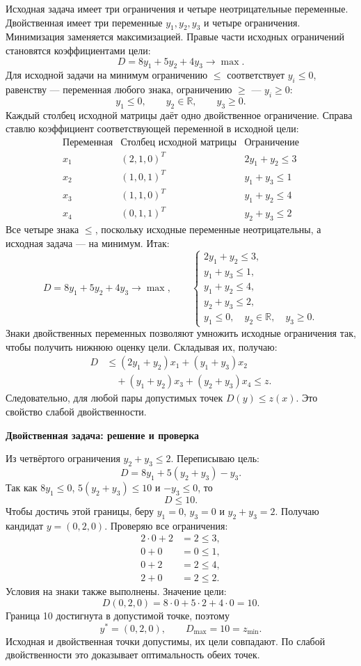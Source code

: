 \documentclass[12pt,a4paper]{article}
\begin{document}
Исходная задача имеет три ограничения и четыре неотрицательные переменные.
Двойственная имеет три переменные $y_1,y_2,y_3$ и четыре ограничения.
Минимизация заменяется максимизацией. Правые части исходных ограничений
становятся коэффициентами цели:
\[
D=8y_1+5y_2+4y_3\to\max.
\]
Для исходной задачи на минимум ограничению $\le$ соответствует $y_i\le0$,
равенству --- переменная любого знака, ограничению $\ge$ --- $y_i\ge0$:
\[
y_1\le0,\qquad y_2\in\mathbb R,\qquad y_3\ge0.
\]
Каждый столбец исходной матрицы даёт одно двойственное ограничение.
Справа ставлю коэффициент соответствующей переменной в исходной цели:
\[
\begin{array}{c|c|c}
\text{Переменная}&\text{Столбец исходной матрицы}&\text{Ограничение}\\\hline
x_1&(2,1,0)^T&2y_1+y_2\le3\\
x_2&(1,0,1)^T&y_1+y_3\le1\\
x_3&(1,1,0)^T&y_1+y_2\le4\\
x_4&(0,1,1)^T&y_2+y_3\le2
\end{array}
\]
Все четыре знака $\le$, поскольку исходные переменные неотрицательны,
а исходная задача --- на минимум. Итак:
\[
\boxed{D=8y_1+5y_2+4y_3\to\max,}
\qquad
\begin{cases}
2y_1+y_2\le3,\\
y_1+y_3\le1,\\
y_1+y_2\le4,\\
y_2+y_3\le2,\\
y_1\le0,\quad y_2\in\mathbb R,\quad y_3\ge0.
\end{cases}
\]
Знаки двойственных переменных позволяют умножить исходные ограничения
так, чтобы получить нижнюю оценку цели. Складывая их, получаю:
\[
\begin{aligned}
D&\le(2y_1+y_2)x_1+(y_1+y_3)x_2\\
&\quad +(y_1+y_2)x_3+(y_2+y_3)x_4\le z.
\end{aligned}
\]
Следовательно, для любой пары допустимых точек $D(y)\le z(x)$.
Это свойство слабой двойственности.
\newpage
\par\textbf{Двойственная задача: решение и проверка}\par

Из четвёртого ограничения $y_2+y_3\le2$. Переписываю цель:
\[
D=8y_1+5(y_2+y_3)-y_3.
\]
Так как $8y_1\le0$, $5(y_2+y_3)\le10$ и $-y_3\le0$, то
\[
D\le10.
\]
Чтобы достичь этой границы, беру $y_1=0$, $y_3=0$ и $y_2+y_3=2$.
Получаю кандидат $y=(0,2,0)$. Проверяю все ограничения:
\[
\begin{aligned}
2\cdot0+2&=2\le3,\\
0+0&=0\le1,\\
0+2&=2\le4,\\
2+0&=2\le2.
\end{aligned}
\]
Условия на знаки также выполнены. Значение цели:
\[
D(0,2,0)=8\cdot0+5\cdot2+4\cdot0=10.
\]
Граница 10 достигнута в допустимой точке, поэтому
\[
\boxed{y^*=(0,2,0),\qquad D_{\max}=10=z_{\min}.}
\]
Исходная и двойственная точки допустимы, их цели совпадают.
По слабой двойственности это доказывает оптимальность обеих точек.
\end{document}
